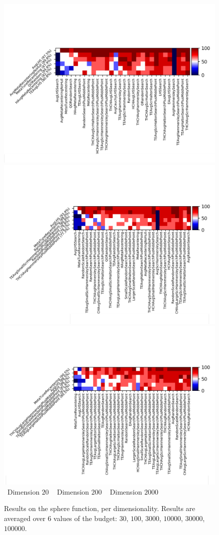 \begin{figure}[t]
\centering
\includegraphics[trim={10 20 12 80}, clip,width=.32\textwidth]{sections/appendix/ppsn2020-rescaling/figures/fight_namesphere,useful_dimensions20.png}
\includegraphics[trim={10 20 12 80}, clip,width=.32\textwidth]{sections/appendix/ppsn2020-rescaling/figures/fight_namesphere,useful_dimensions200.png}
\includegraphics[trim={10 20 12 80}, clip,width=.32\textwidth]{sections/appendix/ppsn2020-rescaling/figures/fight_namesphere,useful_dimensions2000.png}   \\
~\hfill Dimension $20$ \hfill ~ \hfill Dimension $200$ \hfill ~ \hfill Dimension $2000$\hfill ~\\
\caption{Results on the sphere function, per dimensionality. Results are  averaged over 6 values of the budget: $30$, $100$, $3000$, $10000$, $30000$, $100000$. }
    \label{toto2}
\end{figure}

